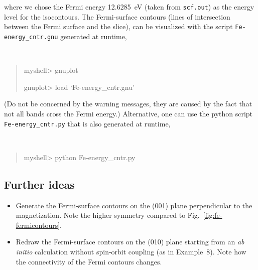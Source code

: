 \documentclass[a4paper,11pt,twoside]{article}
\begin{document}
where we chose the Fermi energy 12.6285~eV (taken from {\tt scf.out})
as the energy level for the isocontours.  The Fermi-surface contours
(lines of intersection between the Fermi surface and the slice), can
be visualized with the script {\tt Fe-energy\_cntr.gnu} generated at
runtime,
%
{\tt
\begin{quote}
myshell> gnuplot

gnuplot> load `Fe-energy\_cntr.gnu'
\end{quote} }
%
(Do not be concerned by the warning messages, they are caused by the
fact that not all bands cross the Fermi energy.) Alternative, one can
use the python script {\tt Fe-energy\_cntr.py} that is also generated
at runtime,
%
{\tt
\begin{quote}
myshell> python Fe-energy\_cntr.py
\end{quote} }


%



\subsection*{Further ideas}

\begin{itemize}


\item Generate the Fermi-surface contours on the (001) plane
perpendicular to the magnetization. Note the higher symmetry compared
to Fig.~\ref{fig:fe-fermicontours}.

\item Redraw the Fermi-surface contours on the (010) plane starting
  from an {\it ab initio} calculation without spin-orbit coupling (as
  in Example~8). Note how the connectivity of the Fermi contours
  changes.

\end{itemize}
\end{document}
